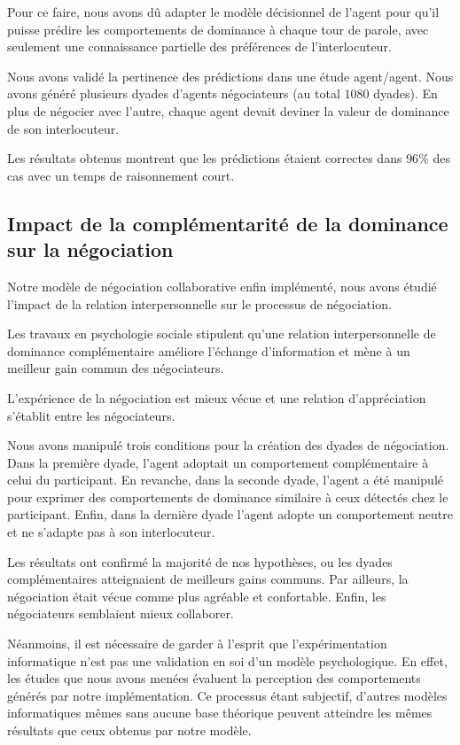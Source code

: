 Pour ce faire, nous avons dû adapter le modèle décisionnel de l'agent pour qu'il puisse prédire les comportements de dominance à chaque tour de parole, avec seulement une connaissance partielle des préférences de l'interlocuteur. 

Nous avons validé la pertinence des prédictions dans une étude agent/agent. Nous avons généré plusieurs dyades d'agents négociateurs (au total $1080$ dyades). En plus de négocier avec l'autre, chaque agent devait deviner la valeur de dominance de son interlocuteur.

Les résultats obtenus montrent que les prédictions étaient correctes dans $96\%$ des cas avec un temps de raisonnement court. 

\subsection{Impact de la complémentarité de la dominance sur la négociation}

Notre modèle de négociation collaborative enfin implémenté, nous avons étudié l'impact de la relation interpersonnelle sur le processus de négociation. 

Les travaux en psychologie sociale stipulent qu’une relation interpersonnelle de dominance complémentaire améliore l’échange d’information et mène à un meilleur gain commun des négociateurs.

L’expérience de la négociation est mieux vécue et une relation d’appréciation s’établit entre les négociateurs. 

Nous avons manipulé trois conditions pour la création des dyades de négociation. Dans la première dyade, l'agent adoptait un comportement complémentaire à celui du participant. En revanche, dans la seconde dyade, l'agent a été manipulé pour exprimer des comportements de dominance similaire à ceux détectés chez le participant. Enfin, dans la dernière dyade l'agent adopte un comportement neutre et ne s'adapte pas à son interlocuteur.

Les résultats ont confirmé la majorité de nos hypothèses, ou les dyades complémentaires atteignaient de meilleurs gains communs. Par ailleurs,  la négociation était vécue comme plus agréable et confortable. Enfin, les négociateurs semblaient mieux collaborer. 

Néanmoins, il est nécessaire de garder à l’esprit que l’expérimentation informatique n’est pas une validation en soi d’un modèle psychologique. En effet, les études que nous avons menées évaluent la perception des comportements générés par notre implémentation. Ce processus étant subjectif, d'autres modèles informatiques mêmes sans aucune base théorique peuvent atteindre les mêmes résultats que ceux obtenus par notre modèle.

